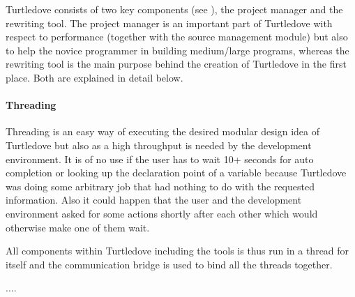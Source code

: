Turtledove consists of two key components (see ),
the project manager and the rewriting tool. The project manager is an important
part of Turtledove with respect to performance (together with the source
management module) but also to help the novice
programmer in building medium/large programs, whereas the rewriting tool is the
main purpose behind the creation of Turtledove in the first place. Both are
explained in detail below.

\paragraph{Threading}

Threading is an easy way of executing the desired modular design idea of
Turtledove but also as a high throughput is needed by the development
environment. It is of no use if the user has to wait 10+ seconds for auto
completion or looking up the declaration point of a variable because Turtledove
was doing some arbitrary job that had nothing to do with the requested
information. Also it could happen that the user and the development environment
asked for some actions shortly after each other which would otherwise make one
of them wait.

All components within Turtledove including the tools is thus run in a thread for
itself and the communication bridge is used to bind all the threads together.















....

